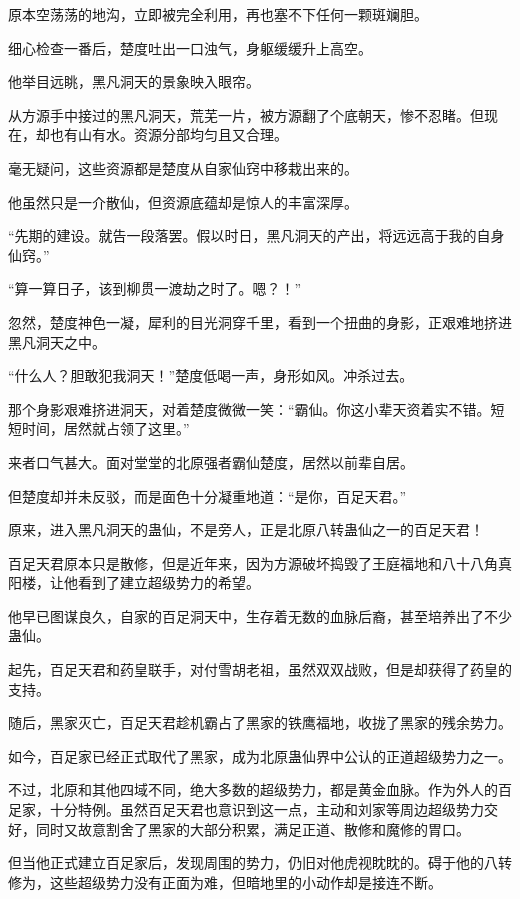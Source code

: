 \begin{this_body}
原本空荡荡的地沟，立即被完全利用，再也塞不下任何一颗斑斓胆。

细心检查一番后，楚度吐出一口浊气，身躯缓缓升上高空。

他举目远眺，黑凡洞天的景象映入眼帘。

从方源手中接过的黑凡洞天，荒芜一片，被方源翻了个底朝天，惨不忍睹。但现在，却也有山有水。资源分部均匀且又合理。

毫无疑问，这些资源都是楚度从自家仙窍中移栽出来的。

他虽然只是一介散仙，但资源底蕴却是惊人的丰富深厚。

“先期的建设。就告一段落罢。假以时日，黑凡洞天的产出，将远远高于我的自身仙窍。”

“算一算日子，该到柳贯一渡劫之时了。嗯？！”

忽然，楚度神色一凝，犀利的目光洞穿千里，看到一个扭曲的身影，正艰难地挤进黑凡洞天之中。

“什么人？胆敢犯我洞天！”楚度低喝一声，身形如风。冲杀过去。

那个身影艰难挤进洞天，对着楚度微微一笑：“霸仙。你这小辈天资着实不错。短短时间，居然就占领了这里。”

来者口气甚大。面对堂堂的北原强者霸仙楚度，居然以前辈自居。

但楚度却并未反驳，而是面色十分凝重地道：“是你，百足天君。”

原来，进入黑凡洞天的蛊仙，不是旁人，正是北原八转蛊仙之一的百足天君！

百足天君原本只是散修，但是近年来，因为方源破坏捣毁了王庭福地和八十八角真阳楼，让他看到了建立超级势力的希望。

他早已图谋良久，自家的百足洞天中，生存着无数的血脉后裔，甚至培养出了不少蛊仙。

起先，百足天君和药皇联手，对付雪胡老祖，虽然双双战败，但是却获得了药皇的支持。

随后，黑家灭亡，百足天君趁机霸占了黑家的铁鹰福地，收拢了黑家的残余势力。

如今，百足家已经正式取代了黑家，成为北原蛊仙界中公认的正道超级势力之一。

不过，北原和其他四域不同，绝大多数的超级势力，都是黄金血脉。作为外人的百足家，十分特例。虽然百足天君也意识到这一点，主动和刘家等周边超级势力交好，同时又故意割舍了黑家的大部分积累，满足正道、散修和魔修的胃口。

但当他正式建立百足家后，发现周围的势力，仍旧对他虎视眈眈的。碍于他的八转修为，这些超级势力没有正面为难，但暗地里的小动作却是接连不断。


\end{this_body}

